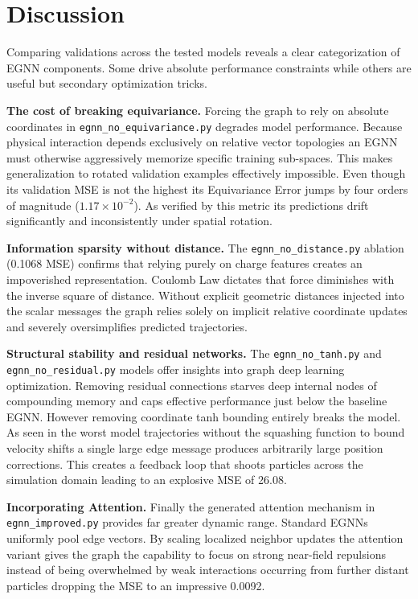 \documentclass{article}
\begin{document}
\section{Discussion}

Comparing validations across the tested models reveals a clear categorization of EGNN components. Some drive absolute performance constraints while others are useful but secondary optimization tricks. 

\textbf{The cost of breaking equivariance.} Forcing the graph to rely on absolute coordinates in \texttt{egnn\_no\_equivariance.py} degrades model performance. Because physical interaction depends exclusively on relative vector topologies an EGNN must otherwise aggressively memorize specific training sub-spaces. This makes generalization to rotated validation examples effectively impossible. Even though its validation MSE is not the highest its Equivariance Error jumps by four orders of magnitude ($1.17 \times 10^{-2}$). As verified by this metric its predictions drift significantly and inconsistently under spatial rotation.

\textbf{Information sparsity without distance.} The \texttt{egnn\_no\_distance.py} ablation (0.1068 MSE) confirms that relying purely on charge features creates an impoverished representation. Coulomb Law dictates that force diminishes with the inverse square of distance. Without explicit geometric distances injected into the scalar messages the graph relies solely on implicit relative coordinate updates and severely oversimplifies predicted trajectories.

\textbf{Structural stability and residual networks.} The \texttt{egnn\_no\_tanh.py} and \texttt{egnn\_no\_residual.py} models offer insights into graph deep learning optimization. Removing residual connections starves deep internal nodes of compounding memory and caps effective performance just below the baseline EGNN. However removing coordinate tanh bounding entirely breaks the model. As seen in the worst model trajectories without the squashing function to bound velocity shifts a single large edge message produces arbitrarily large position corrections. This creates a feedback loop that shoots particles across the simulation domain leading to an explosive MSE of 26.08.

\textbf{Incorporating Attention.} Finally the generated attention mechanism in \texttt{egnn\_improved.py} provides far greater dynamic range. Standard EGNNs uniformly pool edge vectors. By scaling localized neighbor updates the attention variant gives the graph the capability to focus on strong near-field repulsions instead of being overwhelmed by weak interactions occurring from further distant particles dropping the MSE to an impressive 0.0092.
\end{document}
